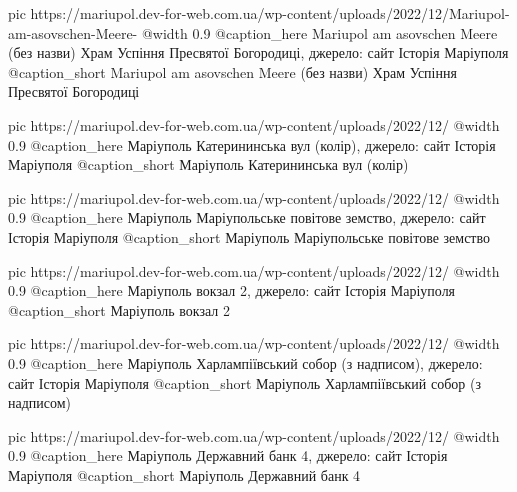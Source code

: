 	pic https://mariupol.dev-for-web.com.ua/wp-content/uploads/2022/12/Mariupol-am-asovschen-Meere-%
	@width 0.9
	@caption_here Mariupol am asovschen Meere (без назви) Храм Успіння Пресвятої Богородиці, джерело: сайт Історія Маріуполя
	@caption_short Mariupol am asovschen Meere (без назви) Храм Успіння Пресвятої Богородиці

	pic https://mariupol.dev-for-web.com.ua/wp-content/uploads/2022/12/%
	@width 0.9
	@caption_here Маріуполь Катерининська вул (колір), джерело: сайт Історія Маріуполя
	@caption_short Маріуполь Катерининська вул (колір)

	pic https://mariupol.dev-for-web.com.ua/wp-content/uploads/2022/12/%
	@width 0.9
	@caption_here Маріуполь Маріупольське повітове земство, джерело: сайт Історія Маріуполя
	@caption_short Маріуполь Маріупольське повітове земство

	pic https://mariupol.dev-for-web.com.ua/wp-content/uploads/2022/12/%
	@width 0.9
	@caption_here Маріуполь вокзал 2, джерело: сайт Історія Маріуполя
	@caption_short Маріуполь вокзал 2

	pic https://mariupol.dev-for-web.com.ua/wp-content/uploads/2022/12/%
	@width 0.9
	@caption_here Маріуполь Харлампіївський собор (з надписом), джерело: сайт Історія Маріуполя
	@caption_short Маріуполь Харлампіївський собор (з надписом)

	pic https://mariupol.dev-for-web.com.ua/wp-content/uploads/2022/12/%
	@width 0.9
	@caption_here Маріуполь Державний банк 4, джерело: сайт Історія Маріуполя
	@caption_short Маріуполь Державний банк 4

